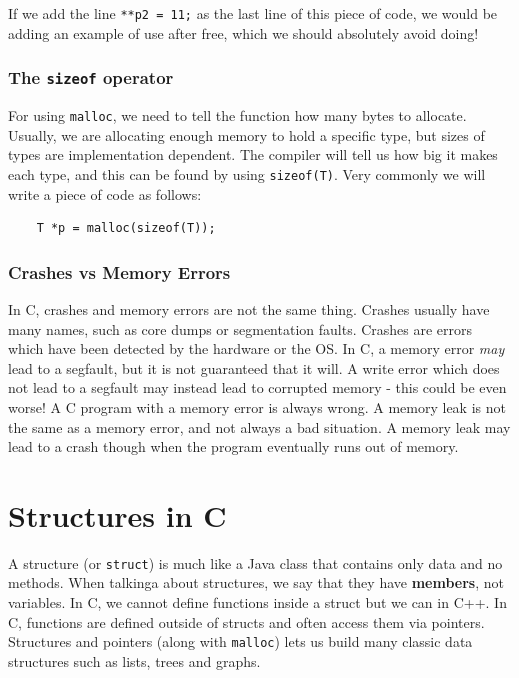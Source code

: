 \documentclass{article}
\begin{document}
	If we add the line \texttt{**p2 = 11;} as the last line of this piece of code, we would be adding an example of use after free, which we should absolutely avoid doing!
	
	\subsubsection{The \texttt{sizeof} operator}
	For using \texttt{malloc}, we need to tell the function how many bytes to allocate. Usually, we are allocating enough memory to hold a specific type, but sizes of types are implementation dependent. The compiler will tell us how big it makes each type, and this can be found by using \texttt{sizeof(T)}. Very commonly we will write a piece of code as follows:
	
	\begin{verbatim}
	T *p = malloc(sizeof(T));
	\end{verbatim}
	
	\subsubsection{Crashes vs Memory Errors}
	In C, crashes and memory errors are not the same thing. Crashes usually have many names, such as core dumps or segmentation faults. Crashes are errors which have been detected by the hardware or the OS. In C, a memory error \textit{may} lead to a segfault, but it is not guaranteed that it will. A write error which does not lead to a segfault may instead lead to corrupted memory - this could be even worse! A C program with a memory error is always wrong. A memory leak is not the same as a memory error, and not always a bad situation. A memory leak may lead to a crash though when the program eventually runs out of memory.
	
	\section{Structures in C}
	A structure (or \texttt{struct}) is much like a Java class that contains only data and no methods. When talkinga about structures, we say that they have \textbf{members}, not variables. In C, we cannot define functions inside a struct but we can in C++. In C, functions are defined outside of structs and often access them via pointers. Structures and pointers (along with \texttt{malloc}) lets us build many classic data structures such as lists, trees and graphs.
	
\end{document}
